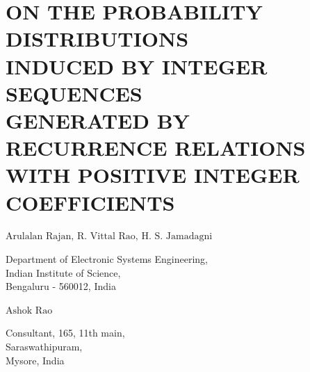 \chapter{ON THE PROBABILITY DISTRIBUTIONS\\ INDUCED BY INTEGER SEQUENCES\\ GENERATED BY RECURRENCE RELATIONS\\ WITH POSITIVE INTEGER COEFFICIENTS}

\vskip 0.8cm

\begin{center}
{\large\uppercase{$\text{Arulalan Rajan, R. Vittal Rao, H. S. Jamadagni}$}} 

\vskip -6pt

Department of Electronic Systems Engineering,\\ Indian Institute of Science,\\ Bengaluru - 560012, India 

\end{center}


\begin{center}
{\large\uppercase{$\text{Ashok Rao}$}} 

\vskip -6pt

Consultant, 165, 11th main,\\ Saraswathipuram,\\ Mysore, India

\end{center}



\vfill




\newpage

